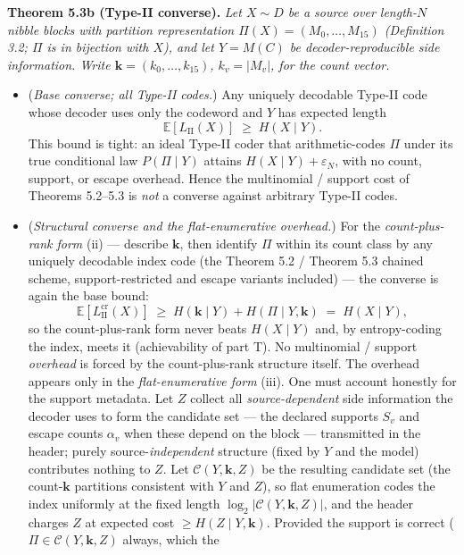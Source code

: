 \documentclass[
]{article}
\begin{document}
\textbf{Theorem 5.3b (Type-II converse).} \emph{Let $X \sim D$ be a
source over length-$N$ nibble blocks with partition representation
$\Pi(X) = (M_0, \ldots, M_{15})$ (Definition 3.2; $\Pi$ is in bijection
with $X$), and let $Y = M(C)$ be decoder-reproducible side information.
Write $\mathbf{k} = (k_0, \ldots, k_{15})$, $k_v = |M_v|$, for the
count vector.}
\begin{itemize}
\item[\textbf{(C)}] (\emph{Base converse; all Type-II codes.}) Any
uniquely decodable Type-II code whose decoder uses only the codeword and
$Y$ has expected length
\[
\mathbb{E}[L_{\mathrm{II}}(X)] \;\geq\; H(X \mid Y).
\]
This bound is tight: an ideal Type-II coder that arithmetic-codes
$\Pi$ under its true conditional law $P(\Pi \mid Y)$ attains
$H(X \mid Y) + \varepsilon_N$, with no count, support, or escape
overhead. Hence the multinomial / support cost of Theorems 5.2--5.3 is
\emph{not} a converse against arbitrary Type-II codes.
\item[\textbf{(S)}] (\emph{Structural converse and the flat-enumerative
overhead.}) For the \emph{count-plus-rank form} (ii) --- describe
$\mathbf{k}$, then identify $\Pi$ within its count class by any uniquely
decodable index code (the Theorem 5.2 / Theorem 5.3 chained scheme,
support-restricted and escape variants included) --- the converse is
again the base bound:
\[
\mathbb{E}[L_{\mathrm{II}}^{\mathrm{cr}}(X)] \;\geq\; H(\mathbf{k} \mid Y) + H(\Pi \mid Y, \mathbf{k}) \;=\; H(X \mid Y),
\]
so the count-plus-rank form never beats $H(X \mid Y)$ and, by
entropy-coding the index, meets it (achievability of part T). No
multinomial / support \emph{overhead} is forced by the count-plus-rank
structure itself. The overhead appears only in the \emph{flat-enumerative
form} (iii). One must account honestly for the support metadata. Let $Z$
collect all \emph{source-dependent} side information the decoder uses to
form the candidate set --- the declared supports $S_v$ and escape counts
$\alpha_v$ when these depend on the block --- transmitted in the header;
purely source-\emph{independent} structure (fixed by $Y$ and the model)
contributes nothing to $Z$. Let $\mathcal{C}(Y, \mathbf{k}, Z)$ be the
resulting candidate set (the count-$\mathbf{k}$ partitions consistent with
$Y$ and $Z$), so flat enumeration codes the index uniformly at the fixed
length $\log_2 |\mathcal{C}(Y, \mathbf{k}, Z)|$, and the header charges
$Z$ at expected cost $\geq H(Z \mid Y, \mathbf{k})$. Provided the support
is correct ($\Pi \in \mathcal{C}(Y, \mathbf{k}, Z)$ always, which the

\end{itemize}
\end{document}
